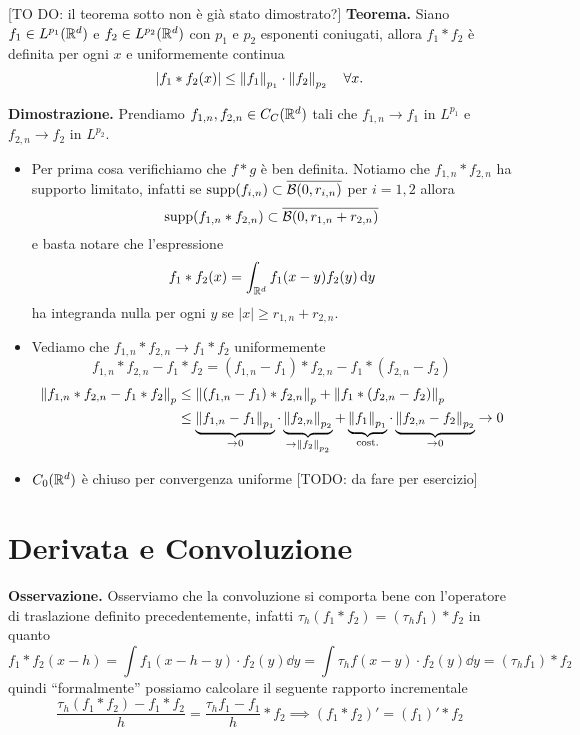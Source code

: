 [TO DO: il teorema sotto non è già stato dimostrato?]
\textbf{Teorema.}
Siano $f_1 \in L^{p_1}(\mathbb R^d)$ e $f_2 \in L^{p_2}(\mathbb R^d)$ con $p_1$ e $p_2$ esponenti coniugati, allora $f_1 \ast f_2$ è definita per ogni $x$ e uniformemente continua
$$
	|f_1 \ast f_2(x)| \leq \left\lVert f_1 \right\rVert_{p_1} \cdot \left\lVert f_2 \right\rVert_{p_2} \quad \forall x.
$$

\textbf{Dimostrazione.}
Prendiamo $f_{1,n}, f_{2, n} \in C_C(\mathbb R^d)$ tali che $f_{1, n} \to f_1$ in $L^{p_1}$ e $f_{2, n} \to f_2$ in $L^{p_2}$.
\begin{itemize}
	\item 
		Per prima cosa verifichiamo che $f \ast g$ è ben definita. Notiamo che $f_{1,n} \ast f_{2,n}$ ha supporto limitato, infatti se $\operatorname{supp}(f_{i,n}) \subset \overline{\mathcal{B}(0, r_{i,n})}$ per $i = 1, 2$ allora
		$$
		\operatorname{supp}(f_{1,n} \ast f_{2,n}) \subset \overline{\mathcal{B}(0, r_{1,n} + r_{2,n})}
		$$
		e basta notare che l'espressione
		$$
		f_1 \ast f_2(x) = \int_{\mathbb R^d} f_1(x - y) f_2(y) \,\mathrm{d} y
		$$
		ha integranda nulla per ogni $y$ se $|x| \geq r_{1,n} + r_{2,n}$.
	
	\item
		Vediamo che $f_{1,n} \ast f_{2,n} \to f_1 \ast f_2$ uniformemente
		$$
		f_{1,n} \ast f_{2,n} - f_1 \ast f_2 
		= (f_{1,n} - f_1) \ast f_{2,n} - f_1 \ast (f_{2,n} - f_2)
		$$
		$$
		\begin{aligned}
			\left\lVert f_{1,n} \ast f_{2,n} - f_1 \ast f_2 \right\rVert_p
			&\leq \left\lVert (f_{1,n} - f_1) \ast f_{2,n} \right\rVert_p + \left\lVert f_1 \ast (f_{2,n} - f_2) \right\rVert_p \\
			&\leq 
			\underbrace{\left\lVert f_{1,n} - f_1 \right\rVert_{p_1}}_{\to 0}
			\cdot \underbrace{\left\lVert f_{2,n} \right\rVert_{p_2}}_{\to \left\lVert f_2 \right\rVert_{p_2}}
			+ \underbrace{\left\lVert f_1 \right\rVert_{p_1}}_{\text{cost.}}
			\cdot \underbrace{\left\lVert f_{2,n} - f_2 \right\rVert_{p_2}}_{\to 0}
			\to 0
		\end{aligned}
		$$

	\item 
		$C_0(\mathbb R^d)$ è chiuso per convergenza uniforme [TODO: da fare per esercizio]
\end{itemize}

\section{Derivata e Convoluzione}

\textbf{Osservazione.}
Osserviamo che la convoluzione si comporta bene con l'operatore di traslazione definito precedentemente, infatti $\tau_h (f_1 \ast f_2) = (\tau_h f_1) \ast f_2$ in quanto
$$
f_1 \ast f_2 (x - h) 
= \int f_1(x - h - y) \cdot f_2(y) \dd y = \int \tau_h f(x - y) \cdot f_2(y) \dd y
= (\tau_h f_1) \ast f_2
$$
quindi ``formalmente'' possiamo calcolare il seguente rapporto incrementale
$$
\frac{\tau_h(f_1 \ast f_2) - f_1 \ast f_2}{h}
= \frac{\tau_h f_1 - f_1}{h} \ast f_2
\implies (f_1 \ast f_2)' = (f_1)' \ast f_2
$$

